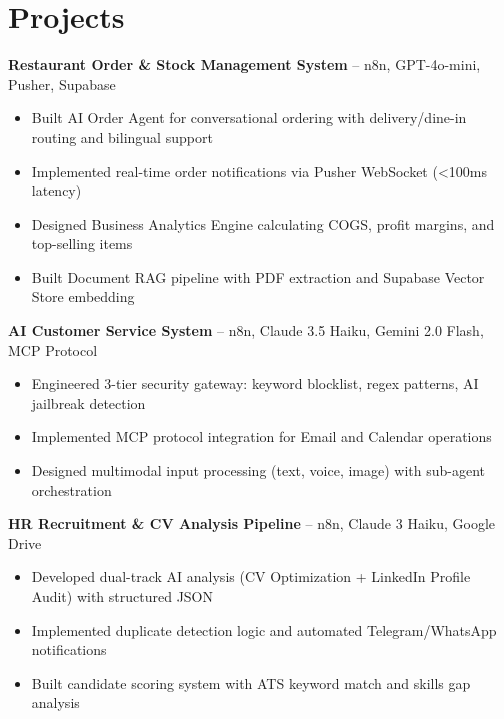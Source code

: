 \documentclass[11pt,a4paper]{article}
\begin{document}
\section*{Projects}

\textbf{Restaurant Order \& Stock Management System} -- n8n, GPT-4o-mini, Pusher, Supabase
\begin{itemize}[leftmargin=0.5cm, itemsep=1pt, topsep=2pt, label={-}]
    \item Built AI Order Agent for conversational ordering with delivery/dine-in routing and bilingual support
    \item Implemented real-time order notifications via Pusher WebSocket (<100ms latency)
    \item Designed Business Analytics Engine calculating COGS, profit margins, and top-selling items
    \item Built Document RAG pipeline with PDF extraction and Supabase Vector Store embedding
\end{itemize}

\vspace{4pt}

\textbf{AI Customer Service System} -- n8n, Claude 3.5 Haiku, Gemini 2.0 Flash, MCP Protocol
\begin{itemize}[leftmargin=0.5cm, itemsep=1pt, topsep=2pt, label={-}]
    \item Engineered 3-tier security gateway: keyword blocklist, regex patterns, AI jailbreak detection
    \item Implemented MCP protocol integration for Email and Calendar operations
    \item Designed multimodal input processing (text, voice, image) with sub-agent orchestration
\end{itemize}

\vspace{4pt}

\textbf{HR Recruitment \& CV Analysis Pipeline} -- n8n, Claude 3 Haiku, Google Drive
\begin{itemize}[leftmargin=0.5cm, itemsep=1pt, topsep=2pt, label={-}]
    \item Developed dual-track AI analysis (CV Optimization + LinkedIn Profile Audit) with structured JSON
    \item Implemented duplicate detection logic and automated Telegram/WhatsApp notifications
    \item Built candidate scoring system with ATS keyword match and skills gap analysis
\end{itemize}
\end{document}
